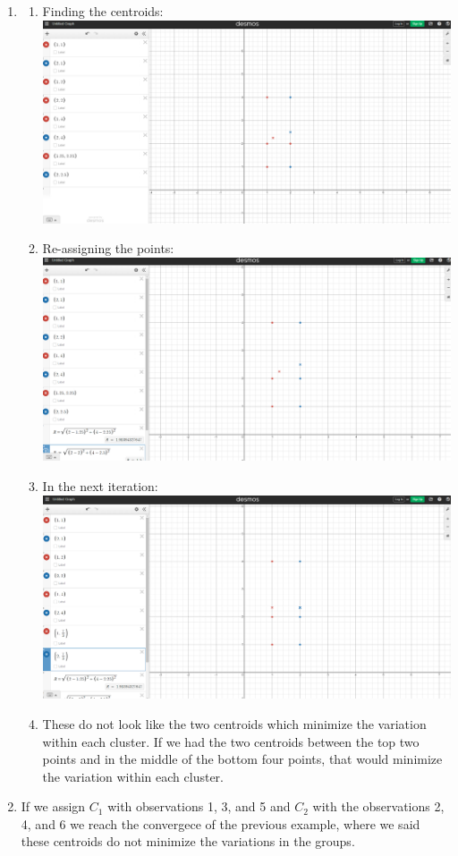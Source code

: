 \documentclass[10pt]{exam}
\begin{document}
\begin{enumerate}
    \item 
    \begin{enumerate}
        \item Finding the centroids: \\ 
        \includegraphics[scale = .3]{2a.png}
        \item Re-assigning the points: \\ 
        \includegraphics[scale = .3]{2b.png}
        \item In the next iteration: \\ 
        \includegraphics[scale = .3]{2c.png}
        \item These do not look like the two centroids which minimize the variation within
        each cluster. If we had the two centroids between the top two points and in the 
        middle of the bottom four points, that would minimize the variation within each cluster. 
    \end{enumerate}

    \item If we assign $C_1$ with observations 1, 3, and 5 and $C_2$ with the observations 
    2, 4, and 6 we reach the convergece of the previous example, where we said these centroids 
    do not minimize the variations in the groups. 
\end{enumerate}
\end{document}

